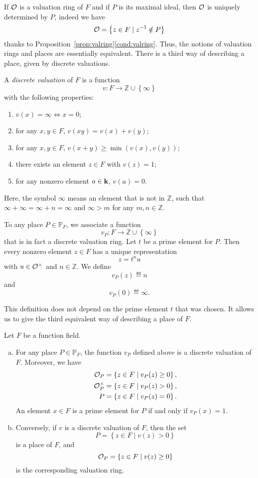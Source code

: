 If $\mathcal{O}$ is a valuation ring of $F$ and if $P$ is its maximal ideal, then $\mathcal{O}$
is uniquely determined by $P$, indeed we have
\[
  \mathcal{O} = \left\{ z\in F\mid z^{-1}\notin P \right\}
\]
thanks to Proposition~\ref{prop:valring}\ref{cond:valring}. Thus, the notions of
valuation rings and places are essentially equivalent. There is a third way of
describing a place, given by discrete valuations.
\begin{defi}
  A \emph{discrete valuation} of $F$ is a function
  \[
    v:F\to\mathbb{Z}\cup\left\{ \infty \right\}
  \]
  with the following properties:
  \begin{enumerate}
    \item $v(x) = \infty \Leftrightarrow x=0$;
    \item for any $x,y\in F$, $v(xy) = v(x)+v(y)$;
    \item for any $x,y\in F$, $v(x+y)\geq\min(v(x), v(y))$;
    \item there exists an element $z\in F$ with $v(z)=1$;
    \item for any nonzero element $a\in\mathbf{k}$, $v(a) = 0$.
  \end{enumerate}
\end{defi}
Here, the symbol $\infty$ means an element that is not in $\mathbb{Z}$, such
that $\infty+\infty = \infty + n = \infty$ and $\infty > m$ for any
$m,n\in\mathbb{Z}$.
\begin{defi}
  To any place $P\in\mathbb{P}_F$, we associate a function
  \[
    v_P:F\to\mathbb{Z}\cup\left\{ \infty \right\}
  \]
  that is in fact a discrete valuation ring. Let $t$ be a prime element for $P$.
  Then every nonzero element $z\in F$ has a unique representation
  \[
    z = t^n u
  \]
  with $u\in\mathcal{O}^\times$ and $n\in\mathbb{Z}$. We define
  \[
    v_P(z)\eqdef n
  \]
  and
  \[
    v_P(0)\eqdef\infty.
  \]
\end{defi}
This definition does not depend on the prime element $t$ that was chosen. It
allows us to give the third equivalent way of describing a place of $F$.
\begin{thm}
 Let $F$ be a function field.
 \begin{enumerate}[(a)]
   \item For any place $P\in\mathbb{P}_F$, the function $v_P$ defined above is a
     discrete valuation of $F$. Moreover, we have
     \begin{align*}
       \mathcal{O}_P &= \left\{ z\in F\mid v_P(z)\geq0 \right\},\\
       \mathcal{O}_P^\times &= \left\{ z\in F\mid v_P(z)>0 \right\},\\
       P &= \left\{ z\in F\mid v_P(z)=0 \right\}.
     \end{align*}
     An element $x\in F$ is a prime element for $P$ if and only if $v_P(x)=1$.
   \item Conversely, if $v$ is a discrete valuation of $F$, then the set
     \[
       P = \left\{ z\in F\mid v(z)>0 \right\}
     \]
     is a place of $F$, and
     \[
       \mathcal{O}_P = \left\{ z\in F\mid v(z)\geq0\right\}
     \]
     is the corresponding valuation ring.
 \end{enumerate}
\end{thm}
